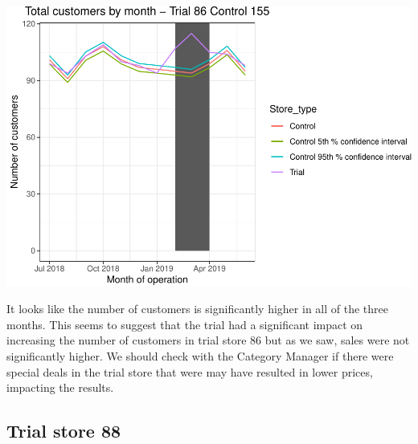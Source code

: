 \documentclass[]{article}
\begin{document}
\includegraphics{Task2_files/figure-latex/unnamed-chunk-12-1}

It looks like the number of customers is significantly higher in all of
the three months. This seems to suggest that the trial had a significant
impact on increasing the number of customers in trial store 86 but as we
saw, sales were not significantly higher. We should check with the
Category Manager if there were special deals in the trial store that
were may have resulted in lower prices, impacting the results.

\hypertarget{trial-store-88}{%
\subsection{Trial store 88}\label{trial-store-88}}
\end{document}
